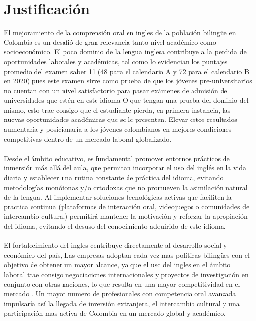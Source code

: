 \newpage
\section{Justificación}

El mejoramiento de la comprensión oral en ingles de la población bilingüe en Colombia es un desafió de gran relevancia tanto nivel académico como socioeconómico. El poco dominio de la lengua inglesa contribuye a la perdida de oportunidades laborales y académicas, tal como lo evidencian los puntajes promedio del examen saber 11 (48 para el calendario A y 72 para el calendario B en 2020) pues este examen sirve como prueba de que los jóvenes pre-universitarios no cuentan con un nivel satisfactorio para pasar exámenes de admisión de universidades que estén en este idioma O que tengan una prueba del dominio del mismo, esto trae consigo que el estudiante pierda, en primera instancia, las nuevas oportunidades académicas que se le presentan. Elevar estos resultados aumentaría y posicionaría a los jóvenes colombianos en mejores condiciones competitivas dentro de un mercado laboral globalizado.
\\
\\
Desde el ámbito educativo, es fundamental promover entornos prácticos de inmersión más allá del aula, que permitan incorporar el uso del inglés en la vida diaria y establecer una rutina constante de práctica del idioma, evitando metodologías monótonas y/o ortodoxas que no promueven la asimilación natural de la lengua. Al implementar soluciones tecnológicas activas que faciliten la practica continua (plataformas de interacción oral, videojuegos o comunidades de intercambio cultural) permitirá mantener la motivación y reforzar la apropiación del idioma, evitando el desuso del conocimiento adquirido de este idioma.
\\
\\
El fortalecimiento del ingles contribuye directamente al desarrollo social y económico del país, Las empresas adoptan cada vez mas políticas bilingües con el objetivo de obtener un mayor alcance, ya que el uso del ingles en el ámbito laboral trae consigo negociaciones internacionales y proyectos de investigación en conjunto con otras naciones, lo que resulta en una mayor competitividad en el mercado \cite{cronquist2017aprendizaje}. Un mayor numero de profesionales con competencia oral avanzada impulsaría así la llegada de inversión extranjera, el intercambio cultural y una participación mas activa de Colombia en un mercado global y académico.
\\
